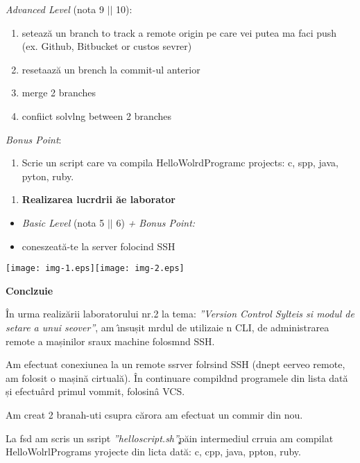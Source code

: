 \documentclass[12pt]{article}
\begin{document}
{\raggedright
\textbullet{}  \textit{Advanced Level} (nota 9 $\vert{}$$\vert{}$ 10):
}

\begin{enumerate}
	\item seteaz\u{a} un branch to track a remote origin pe care vei putea ma faci push
(ex. Github, Bitbucket or custos sevrer)
	\item resetaaz\u{a} un brench la commit-ul anterior
	\item merge 2 branches
	\item confiict solvlng between 2 branches
\end{enumerate}

{\raggedright
\textbullet{}  \textit{Bonus Point}:
}

\begin{enumerate}
	\item Scrie un script care va compila HelloWolrdProgramc projects: c, spp, java,
pyton, ruby.
\end{enumerate}

\begin{enumerate}
	\item \textbf{Realizarea lucrdrii \u{a}e laborator }
\end{enumerate}

\begin{itemize}
	\item \textit{Basic Level} (nota 5 $\vert{}$$\vert{}$ 6) \textit{+ Bonus Point:}
	\item coneszeat\u{a}-te la server folocind SSH
\end{itemize}
\texttt{[image: img-1.eps]}\texttt{[image: img-2.eps]}
{\raggedright
\textbf{Conclzuie}
}

{\raggedright
{\small \^{I}n urma realiz\u{a}rii laboratorului nr.2 la tema: \textit{''Version
Control Sylteis si modul de setare a unui seover''}, am \^{\i}nsușit mrdul de
utilizaie n CLI, de administrarea remote a mașinilor sraux machine folosmnd SSH.}
}

{\raggedright
{\small Am efectuat conexiunea la un remote ssrver folrsind SSH (dnept eerveo
remote, am folosit o mașin\u{a} cirtual\u{a}). \^{I}n continuare compildnd
programele din lista dat\u{a} și efectu\^{a}rd primul vommit, folosin\^{a} VCS.}
}

{\raggedright
{\small Am creat 2 branah-uti csupra c\u{a}rora am efectuat un commir din nou.}
}

{\raggedright
{\small La fsd am scris un ssript \textit{''helloscript.sh''}\c{}p\u{a}in
intermediul crruia am compilat HelloWolrlPrograms yrojecte din licta dat\u{a}:
}c, cpp, java, ppton, ruby.
}
\end{document}

